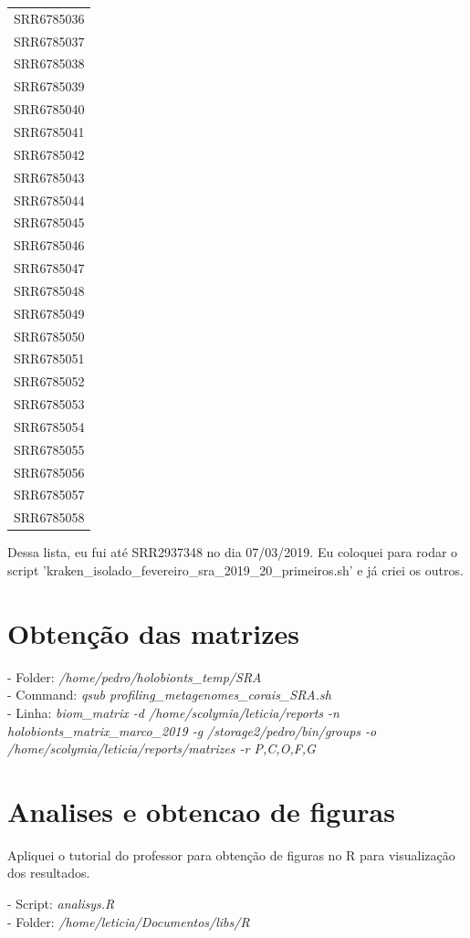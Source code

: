 \documentclass[12pt, a4paper]{report}
\begin{document}
\begin{center}
\begin{longtable}{c}
		SRR6785036\\
		SRR6785037\\
		SRR6785038\\
		SRR6785039\\
		SRR6785040\\
		SRR6785041\\
		SRR6785042\\
		SRR6785043\\
		SRR6785044\\
		SRR6785045\\
		SRR6785046\\
		SRR6785047\\
		SRR6785048\\
		SRR6785049\\
		SRR6785050\\
		SRR6785051\\
		SRR6785052\\
		SRR6785053\\
		SRR6785054\\
		SRR6785055\\
		SRR6785056\\
		SRR6785057\\
		SRR6785058\\
	\end{longtable}
\end{center}

Dessa lista, eu fui até SRR2937348 no dia 07/03/2019. Eu coloquei para rodar o script 'kraken\_isolado\_fevereiro\_sra\_2019\_20\_primeiros.sh' e já criei os outros. 

\section{Obtenção das matrizes}
\begin{tcolorbox}[width=6.3in]
	- Folder: \textit{/home/pedro/holobionts\_temp/SRA} \\
	- Command: \textit{qsub profiling\_metagenomes\_corais\_SRA.sh}\\
	- Linha: \textit{biom\_matrix -d /home/scolymia/leticia/reports -n holobionts\_matrix\_marco\_2019 -g /storage2/pedro/bin/groups -o /home/scolymia/leticia/reports/matrizes -r P,C,O,F,G}
\end{tcolorbox}



\newpage
\section{Analises e obtencao de figuras}
Apliquei o tutorial do professor para obtenção de figuras no R para visualização dos resultados. \\
\begin{tcolorbox}[width=6.3in]
- Script: \textit{analisys.R}\\
- Folder: \textit{/home/leticia/Documentos/libs/R}
\end{tcolorbox}
\end{document}
